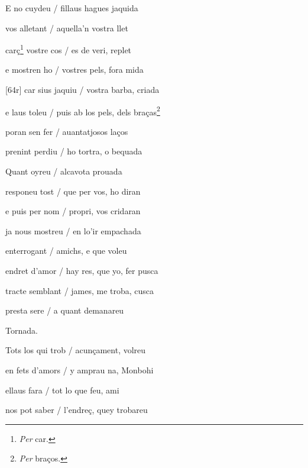 \documentclass[12pt]{article}
\begin{document}
\begin{estrofa}

 E no cuydeu / fillaus hagues jaquida

 vos alletant / aquella'n vostra llet

 car\c{c}\footnote{\textit{Per }car.} vostre cos / es de veri, replet

 e mostren ho / vostres pels, fora mida

 [64r] car sius jaquiu / vostra barba, criada

 e laus toleu / puis ab los pels, dels bra\c{c}as\footnote{\textit{Per
}bra\c{c}os.}

 poran sen fer / auantatjosos la\c{c}os

 prenint perdiu / ho tortra, o bequada

\end{estrofa}



\begin{estrofa}

 Quant oyreu / alcavota prouada

 responeu tost / que per vos, ho diran

 e puis per nom / propri, vos cridaran

 ja nous mostreu / en lo'ir empachada

 enterrogant / amichs, e que voleu

 endret d'amor / hay res, que yo, fer pusca

 tracte semblant / james, me troba, cusca \cite{ref44}

 presta sere / a quant demanareu

\end{estrofa}


\begin{estrofaExtra}%




\begin{tornada}

Tornada.

\end{tornada}


\end{estrofaExtra}


\begin{estrofa}

 Tots los qui trob / acun\c{c}ament, volreu

 en fets d'amors / y amprau na, Monbohi

 ellaus fara / tot lo que feu, ami

 nos pot saber / l'endre\c{c}, quey trobareu

\end{estrofa}
\end{document}
